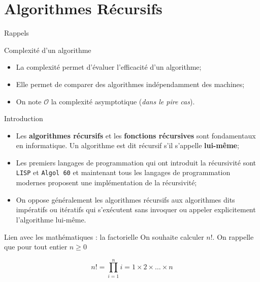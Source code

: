 \documentclass[10pt,xcolor=dvipsnames]{beamer}
\begin{document}
\section{Algorithmes Récursifs}


\begin{frame}{Rappels}
    \begin{alertblock}{Complexité d'un algorithme}
    \begin{itemize}
        \item La complexité permet d'évaluer l'efficacité d'un algorithme;
        \item Elle permet de comparer des algorithmes indépendamment des machines;
        \item On note $\mathcal{O}$ la complexité asymptotique (\textit{dans le pire cas}).
    \end{itemize}
    \end{alertblock}
\end{frame}


\begin{frame}{Introduction}
    \begin{itemize}
        \item Les \alert{\textbf{algorithmes récursifs}} et les \alert{\textbf{fonctions récursives}} sont fondamentaux en informatique. Un algorithme est dit récursif s'il s'appelle \textbf{lui-même};
        \item Les premiers langages de programmation qui ont introduit la récursivité sont \texttt{LISP} et \texttt{Algol 60} et maintenant tous les langages de programmation modernes proposent une implémentation de la récursivité;
        \item On oppose généralement les algorithmes récursifs aux algorithmes dits \alert{impératifs} ou \alert{itératifs} qui s'exécutent sans invoquer ou appeler explicitement l'algorithme lui-même.
    \end{itemize}
\end{frame}



\begin{frame}{Lien avec les mathématiques : la factorielle}
On souhaite calculer $n!$. On rappelle que pour tout entier $n \geq 0$

\begin{equation*}
    n! = \prod_{i=1}^{n} i = 1 \times 2 \times \ldots \times n
\end{equation*}


\end{frame}
\end{document}
